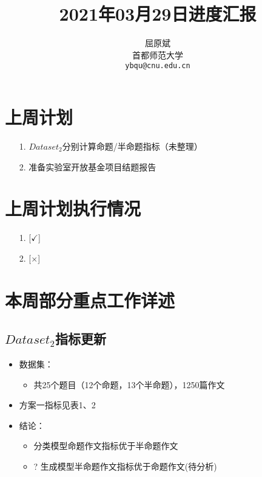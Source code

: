 \documentclass[11pt]{article}
\title{2021年03月29日进度汇报}
\author{屈原斌 \\
  首都师范大学 \\
    {\tt ybqu@cnu.edu.cn}}
\date{}
\begin{document}
\begin{CJK}{UTF8}{gkai}

\maketitle
\CJKindent

\section{上周计划}


\begin{itemize}
  \item [1.] $Dataset_2$分别计算命题/半命题指标（未整理）
  \item [2.] 准备实验室开放基金项目结题报告
\end{itemize}


\section{上周计划执行情况}
\begin{itemize}
\item [1.] [$\checkmark$] 
\item [2.] [$\times$] 
\end{itemize}

\section{本周部分重点工作详述}

\subsection{$Dataset_2$指标更新}

\begin{itemize}
  \item 数据集：
  \begin{itemize}
    \item 共25个题目（12个命题，13个半命题），1250篇作文
  \end{itemize}
  \item 方案一指标见表1、2
  \item 结论：
  \begin{itemize}
    \item 分类模型命题作文指标优于半命题作文
    \item ? 生成模型半命题作文指标优于命题作文(待分析)
  \end{itemize}
\end{itemize}


\end{CJK}
\end{document}
